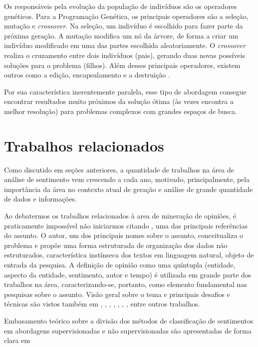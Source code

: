 \documentclass[12pt]{article}
\begin{document}
Os responsáveis pela evolução da população de indivíduos são os operadores genéticos. Para a Programação Genética, os principais operadores são a seleção, mutação e \emph{crossover}. Na seleção, um indivíduo é escolhido para fazer parte da próxima geração. A mutação modifica um nó da árvore, de forma a criar um indivíduo modificado em uma das partes escolhida aleatoriamente. O \emph{crossover} realiza o cruzamento entre dois indivíduos (pais), gerando duas novas possíveis soluções para o problema (filhos). Além desses principais operadores, existem outros como a edição, encapsulamento e a destruição \cite{patelli2011genetic}.

Por sua característica inerentemente paralela, esse tipo de abordagem consegue encontrar resultados muito próximos da solução ótima (às vezes encontra a melhor resolução) para problemas complexos com grandes espaços de busca.

\section{Trabalhos relacionados}

\label{sec:bibl}

Como discutido em seções anteriores, a quantidade de trabalhos na área de análise de sentimento vem crescendo a cada ano, motivado, principalmente, pela importância da área no contexto atual de geração e análise de grande quantidade de dados e informações.

Ao debatermos os trabalhos relacionados à area de mineração de opiniões, é praticamente impossível não iniciarmos citando \cite{liu2010multifaceted}, uma das principais referências do assunto. O autor, um dos principais nomes sobre o assunto, conceitualiza o problema e propõe uma forma estruturada de organização dos dados não estruturados, característica instínseca dos textos em linguagem natural, objeto de entrada da pesquisa. A definição de opinião como uma quíntupla (entidade, aspecto da entidade, sentimento, autor e tempo) é utilizada em grande parte dos trabalhos na área, caracterizando-se, portanto, como elemento fundamental nas pesquisas sobre o assunto. Visão geral sobre o tema e principais desafios e técnicas são vistos também em \cite{mohammad2016challenges}, \cite{ghaleb2016survey}, \cite{kdir16}, \cite{taboada2011lexicon}, \cite{bandhakavi2016lexicon}, \cite{Alessia}, \cite{kaji}, entre outros trabalhos.

Embasamento teórico sobre a divisão dos métodos de classificação de sentimentos em abordagens supervisionadas e não supervisionadas são apresentadas de forma clara em \cite{araujo2013metodos}
\end{document}
